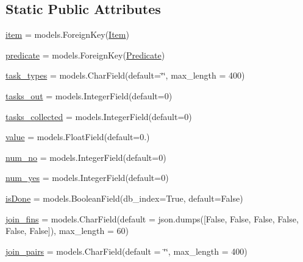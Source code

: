 \subsection*{Static Public Attributes}
\begin{DoxyCompactItemize}
\item 
\hyperlink{classdynamicfilterapp_1_1models_1_1_i_p___pair_a4ed071da1d42b95e2465fb30952d9f80}{item} = models.\+Foreign\+Key(\hyperlink{classdynamicfilterapp_1_1models_1_1_item}{Item})
\item 
\hyperlink{classdynamicfilterapp_1_1models_1_1_i_p___pair_a59edc4e3874fffd0c2a9ef88cddfc0fa}{predicate} = models.\+Foreign\+Key(\hyperlink{classdynamicfilterapp_1_1models_1_1_predicate}{Predicate})
\item 
\hyperlink{classdynamicfilterapp_1_1models_1_1_i_p___pair_a24192fa356f5262f109cd5e03aabcb63}{task\+\_\+types} = models.\+Char\+Field(default=\char`\"{}\char`\"{}, max\+\_\+length = 400)
\item 
\hyperlink{classdynamicfilterapp_1_1models_1_1_i_p___pair_a3f60ead9e071700c26f1b3316e21cfab}{tasks\+\_\+out} = models.\+Integer\+Field(default=0)
\item 
\hyperlink{classdynamicfilterapp_1_1models_1_1_i_p___pair_a898da826737238e06b351e5100410bde}{tasks\+\_\+collected} = models.\+Integer\+Field(default=0)
\item 
\hyperlink{classdynamicfilterapp_1_1models_1_1_i_p___pair_afcc7a4b78ecd8fa7e713f8cfa0f51017}{value} = models.\+Float\+Field(default=0.)
\item 
\hyperlink{classdynamicfilterapp_1_1models_1_1_i_p___pair_a1404efbdb930f496cf5b5db3b4725f4a}{num\+\_\+no} = models.\+Integer\+Field(default=0)
\item 
\hyperlink{classdynamicfilterapp_1_1models_1_1_i_p___pair_aaff200381c3b7863a961b3b8f6c7c64b}{num\+\_\+yes} = models.\+Integer\+Field(default=0)
\item 
\hyperlink{classdynamicfilterapp_1_1models_1_1_i_p___pair_a9dde5beb8f6ffe59012e1b7c5ef641ef}{is\+Done} = models.\+Boolean\+Field(db\+\_\+index=True, default=False)
\item 
\hyperlink{classdynamicfilterapp_1_1models_1_1_i_p___pair_a7e12dec29e5e01e8a9a2db5b2dc6bd71}{join\+\_\+fins} = models.\+Char\+Field(default = json.\+dumps(\mbox{[}False, False, False, False, False, False\mbox{]}), max\+\_\+length = 60)
\item 
\hyperlink{classdynamicfilterapp_1_1models_1_1_i_p___pair_af9b68ef0f5d6fd8f26e308d47de43a88}{join\+\_\+pairs} = models.\+Char\+Field(default = \char`\"{}\char`\"{}, max\+\_\+length = 400)

\end{DoxyCompactItemize}
